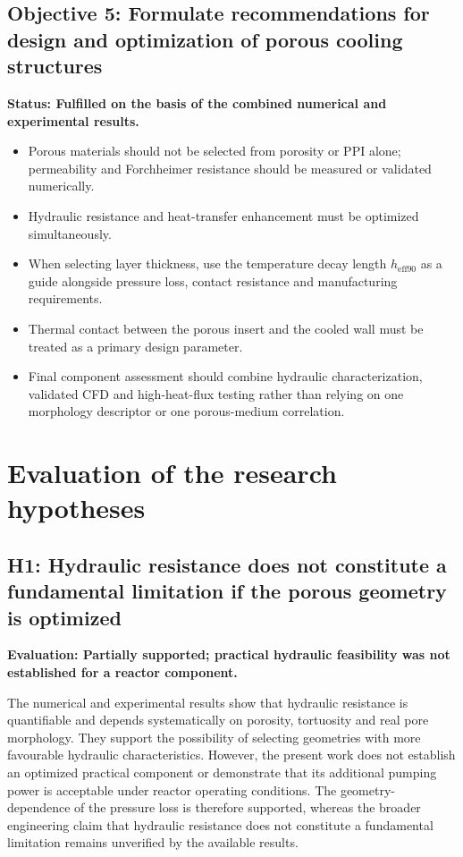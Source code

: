 \documentclass[a4paper]{article}
\begin{document}
\subsection{Objective 5: Formulate recommendations for design and optimization of porous cooling structures}
\textbf{Status: Fulfilled on the basis of the combined numerical and experimental results.}
\begin{itemize}
    \item Porous materials should not be selected from porosity or PPI alone; permeability and Forchheimer resistance should be measured or validated numerically.
    \item Hydraulic resistance and heat-transfer enhancement must be optimized simultaneously.
    \item When selecting layer thickness, use the temperature decay length $h_{\mathrm{eff90}}$ as a guide alongside pressure loss, contact resistance and manufacturing requirements.
    \item Thermal contact between the porous insert and the cooled wall must be treated as a primary design parameter.
    \item Final component assessment should combine hydraulic characterization, validated CFD and high-heat-flux testing rather than relying on one morphology descriptor or one porous-medium correlation.
\end{itemize}

\section{Evaluation of the research hypotheses}

\subsection{H1: Hydraulic resistance does not constitute a fundamental limitation if the porous geometry is optimized}
\textbf{Evaluation: Partially supported; practical hydraulic feasibility was not established for a reactor component.}

The numerical and experimental results show that hydraulic resistance is quantifiable and depends systematically on porosity, tortuosity and real pore morphology. They support the possibility of selecting geometries with more favourable hydraulic characteristics. However, the present work does not establish an optimized practical component or demonstrate that its additional pumping power is acceptable under reactor operating conditions. The geometry-dependence of the pressure loss is therefore supported, whereas the broader engineering claim that hydraulic resistance does not constitute a fundamental limitation remains unverified by the available results.
\end{document}
